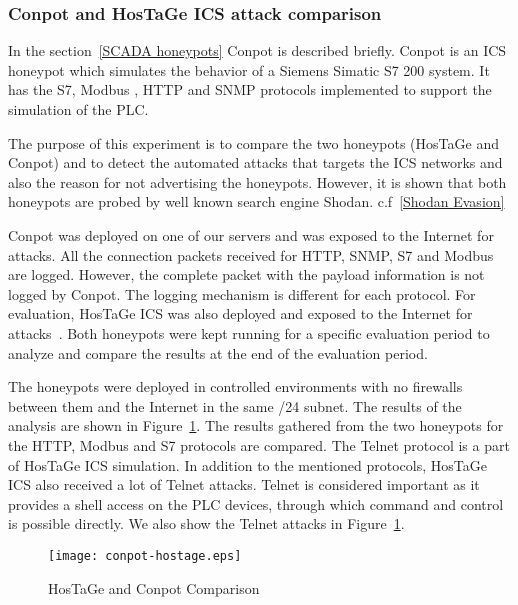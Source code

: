 \documentclass[article,msc=informatik,type=msc,colorback,accentcolor=tud9c]{tudthesis}
\begin{document}
 
 	\vspace{5mm} 
	\subsubsection{Conpot and HosTaGe ICS attack comparison}\label{Conpot and HosTaGe attack comparison}
	In the section~\ref{SCADA honeypots} Conpot  is described briefly. Conpot is an \ac{ICS} honeypot which simulates the behavior of a Siemens Simatic S7 200 system. It has the S7, Modbus , HTTP and \ac{SNMP} protocols implemented to support the simulation of the \ac{PLC}. 
	
	\vspace{3mm}
	The purpose of this experiment is to compare the two honeypots (HosTaGe and Conpot) and to detect the automated attacks that targets the \ac{ICS} networks and also the reason for not advertising the honeypots. However, it is shown that both honeypots are probed by well known search engine Shodan. c.f~\ref{Shodan Evasion}  
	
	\vspace{3mm}
	Conpot was deployed on one of our servers and was exposed to the Internet for attacks. All the connection packets received for HTTP, SNMP, S7 and Modbus are logged. However, the complete packet with the payload  information is not logged by Conpot. The logging mechanism is different for each protocol. 
	For evaluation, HosTaGe ICS was also deployed and exposed to the Internet for attacks~\cite{TUD-CS-2015183}.  Both honeypots were kept running for a specific evaluation period to analyze and compare the results at the end of the evaluation period.
	
	\vspace{3mm}
	The honeypots were deployed in controlled environments with no firewalls between them and the Internet in the same /24 subnet. The results of the analysis are shown in Figure~\ref{f:conpot and hostage comparison}. The results gathered from the two honeypots for the HTTP, Modbus and S7 protocols are compared. The Telnet protocol is a part of HosTaGe ICS simulation.  In addition to the mentioned protocols, HosTaGe ICS also received a lot of Telnet attacks. Telnet is considered important as it provides a shell access on the \ac{PLC} devices, through which command and control is possible directly. We also show the Telnet attacks in Figure~\ref{f:conpot and hostage comparison}. 
		
		
		\begin{figure}[ht]
				           \centering
				           \texttt{[image: conpot-hostage.eps]}
				           \caption[Conpot and Hostage comparison]{\label{f:conpot and hostage comparison}HosTaGe and Conpot Comparison}
				           \end{figure} 
		
\end{document}
